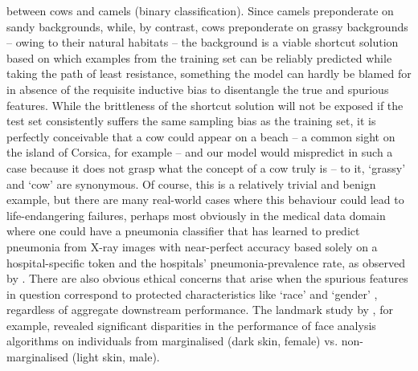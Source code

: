 between cows and camels (binary classification). 
%
Since camels preponderate on sandy backgrounds, while, by contrast, cows preponderate on grassy
backgrounds -- owing to their natural habitats -- the background is a viable shortcut solution
based on which examples from the training set can be reliably predicted while taking the path of
least resistance, something the model can hardly be blamed for in absence of the requisite
inductive bias to disentangle the true and spurious features.
%
While the brittleness of the shortcut solution will not be exposed if the test set consistently
suffers the same sampling bias as the training set, it is perfectly conceivable that a cow could
appear on a beach -- a common sight on the island of Corsica, for example -- and our model would
mispredict in such a case because it does not grasp what the concept of a cow truly is -- to it,
`grassy' and `cow' are synonymous.
%
Of course, this is a relatively trivial and benign example, but there are many real-world cases
where this behaviour could lead to life-endangering failures, perhaps most obviously in the medical
data domain where one could have a pneumonia classifier that has learned to predict pneumonia from
X-ray images with near-perfect accuracy based solely on a hospital-specific token and the
hospitals' pneumonia-prevalence rate, as observed by \cite{zech2018variable}.
%
There are also obvious ethical concerns that arise when the spurious features in question
correspond to protected characteristics like `race' and `gender' \citep{buolamwini2018gender,
wang2019balanced}, regardless of aggregate downstream performance. 
%
The landmark study by \cite{buolamwini2018gender}, for example, revealed significant disparities in
the performance of face analysis algorithms on individuals from marginalised (dark skin, female)
vs. non-marginalised (light skin, male).

